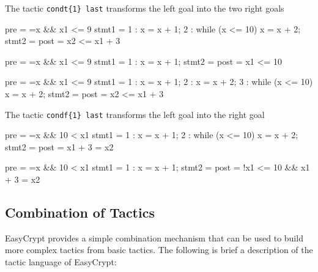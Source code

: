 \Example The tactic \verb+condt{1} last+ transforms the left goal into the two right goals

\begin{minicode}{0.5}

pre   = ={x} && x{1} <= 9
stmt1 =   1 : x = x + 1;
          2 : while (x <= 10) x = x + 2;
stmt2 = 
post  = x{2} <= x{1} + 3

\end{minicode}
\begin{minicode}{0.5}

pre   = ={x} && x{1} <= 9
stmt1 =   1 : x = x + 1;
stmt2 = 
post  = x{1} <= 10

pre   = ={x} && x{1} <= 9
stmt1 =   1 : x = x + 1;
          2 : x = x + 2;
          3 : while (x <= 10) x = x + 2;
stmt2 = 
post  = x{2} <= x{1} + 3

\end{minicode}

\Example The tactic \verb+condf{1} last+ transforms the left goal 
into the right goal  

\begin{minicode}{0.5}

pre   = ={x} && 10 < x{1}
stmt1 =   1 : x = x + 1;
          2 : while (x <= 10) x = x + 2;
stmt2 = 
post  = x{1} + 3 = x{2}

\end{minicode}
\begin{minicode}{0.5}

pre   = ={x} && 10 < x{1}
stmt1 =   1 : x = x + 1;
stmt2 = 
post  = !x{1} <= 10 && x{1} + 3 = x{2}

\end{minicode}

\subsection{Combination of Tactics}
EasyCrypt provides a simple combination mechanism that can be used to build
more complex tactics from basic tactics. The following is brief a
description of the tactic language of EasyCrypt:

